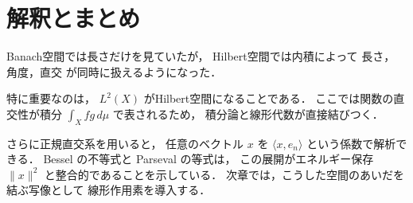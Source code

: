 \section{解釈とまとめ}

Banach空間では長さだけを見ていたが，
Hilbert空間では内積によって
$\text{長さ}$，$\text{角度}$，$\text{直交}$ が同時に扱えるようになった．

特に重要なのは，
$L^2(X)$ がHilbert空間になることである．
ここでは関数の直交性が積分
$\int_X f g\,d\mu$ で表されるため，
積分論と線形代数が直接結びつく．

さらに正規直交系を用いると，
任意のベクトル $x$ を
$\langle x,e_n\rangle$ という係数で解析できる．
Bessel の不等式と Parseval の等式は，
この展開がエネルギー保存
$\|x\|^2$ と整合的であることを示している．
次章では，こうした空間のあいだを結ぶ写像として
線形作用素を導入する．
